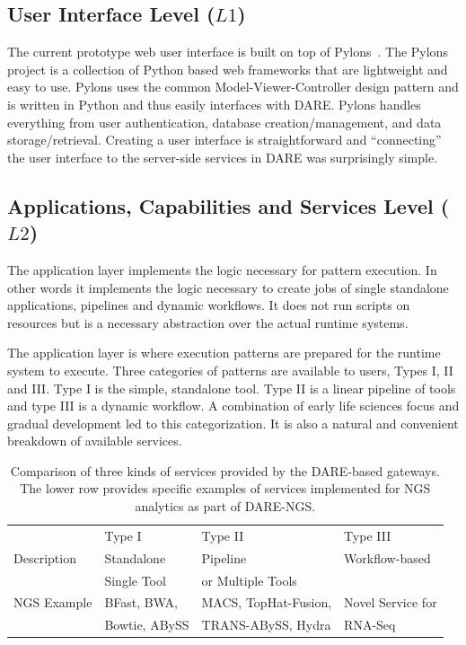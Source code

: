 \documentclass[]{svjour3}
\begin{document}
\subsection{User Interface Level ($L1$)}

The current prototype web user interface is built on top of
Pylons~\cite{pylons_website}. The Pylons project is a collection of
Python based web frameworks that are lightweight and easy to use. Pylons
uses the common Model-Viewer-Controller design pattern and is written
in Python and thus easily interfaces with DARE. Pylons handles everything
from user authentication, database creation/management,
and data storage/retrieval. Creating a user interface is straightforward
and ``connecting'' the user interface to the server-side services in DARE
was surprisingly simple.


\subsection{Applications, Capabilities and Services Level ($L2$)}

The application layer implements the logic necessary for pattern
execution. In other words it implements the logic necessary to
create jobs of single standalone applications, pipelines and
dynamic workflows. It does not run scripts on resources but is
a necessary abstraction over the actual runtime systems. 

The application layer is where execution patterns are prepared for the
runtime system to execute. Three categories of patterns are available
to users, Types I, II and III. Type I is the simple, standalone tool. 
Type II is a linear pipeline of tools and type III is a dynamic workflow.
A combination of early life sciences focus and gradual development
led to this categorization. It is also a natural and convenient
breakdown of available services.


\begin{table}[!h]
\centering
\begin{tabular}{| l | l | l | l |} \hline \rowcolor[rgb]{0.8,0.8,0.8} &
Type I & Type II & Type III \\ Description & Standalone & Pipeline & Workflow-based \\ 
& Single Tool & or Multiple Tools & \\\hline 
NGS Example & BFast, BWA, & MACS, TopHat-Fusion, &  Novel Service for 
 \\
 & Bowtie, ABySS & TRANS-ABySS, Hydra & RNA-Seq \\
\hline
\end{tabular}
\caption{Comparison of three kinds of services provided by the
 DARE-based gateways. The lower row provides specific examples of
 services implemented for NGS analytics as part of DARE-NGS.}
\label{table:three-type-service}
\end{table}
\end{document}
